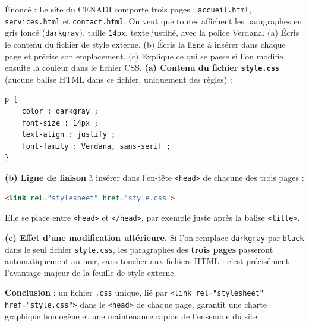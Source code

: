 \documentclass[11pt]{article}
\begin{document}
\begin{exoresolu}
Énoncé : Le site du CENADI comporte trois pages : \texttt{accueil.html}, \texttt{services.html} et \texttt{contact.html}. On veut que toutes affichent les paragraphes en gris foncé (\texttt{darkgray}), taille \texttt{14px}, texte justifié, avec la police Verdana. (a) Écris le contenu du fichier de style externe. (b) Écris la ligne à insérer dans chaque page et précise son emplacement. (c) Explique ce qui se passe si l'on modifie ensuite la couleur dans le fichier CSS.
\tcblower
\textbf{(a) Contenu du fichier \texttt{style.css}} (aucune balise HTML dans ce fichier, uniquement des règles) :
\begin{lstlisting}
p {
    color : darkgray ;
    font-size : 14px ;
    text-align : justify ;
    font-family : Verdana, sans-serif ;
}
\end{lstlisting}

\textbf{(b) Ligne de liaison} à insérer dans l'en-tête \texttt{<head>} de chacune des trois pages :
\begin{lstlisting}[language=HTML]
<link rel="stylesheet" href="style.css">
\end{lstlisting}
Elle se place entre \texttt{<head>} et \texttt{</head>}, par exemple juste après la balise \texttt{<title>}.

\textbf{(c) Effet d'une modification ultérieure.} Si l'on remplace \texttt{darkgray} par \texttt{black} dans le seul fichier \texttt{style.css}, les paragraphes des \textbf{trois pages} passeront automatiquement au noir, sans toucher aux fichiers HTML : c'est précisément l'avantage majeur de la feuille de style externe.

\textbf{Conclusion} : un fichier \texttt{.css} unique, lié par \texttt{<link rel="stylesheet" href="style.css">} dans le \texttt{<head>} de chaque page, garantit une charte graphique homogène et une maintenance rapide de l'ensemble du site.
\end{exoresolu}
\end{document}
